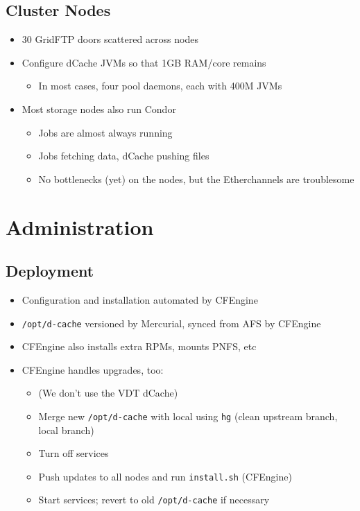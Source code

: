 \documentclass{beamer}
\begin{document}
\subsection{Cluster Nodes}
\begin{frame}
\begin{itemize}
	\item 30 GridFTP doors scattered across nodes
	\item Configure dCache JVMs so that 1GB RAM/core remains
	\begin{itemize}
		\item In most cases, four pool daemons, each with 400M JVMs
	\end{itemize}
	\item Most storage nodes also run Condor
	\begin{itemize}
		\item Jobs are almost always running
		\item Jobs fetching data, dCache pushing files
		\item No bottlenecks (yet) on the nodes, but the Etherchannels are troublesome
	\end{itemize}
\end{itemize}
\end{frame}

\section{Administration}
\subsection{Deployment}
\begin{frame}
\begin{itemize}
	\item Configuration and installation automated by CFEngine
	\item {\tt /opt/d-cache} versioned by Mercurial, synced from AFS by CFEngine
	\item CFEngine also installs extra RPMs, mounts PNFS, etc
	\item CFEngine handles upgrades, too:
	\begin{itemize}
		\item (We don't use the VDT dCache)
		\item Merge new {\tt /opt/d-cache} with local using {\tt hg} (clean upstream branch, local branch)
		\item Turn off services
		\item Push updates to all nodes and run {\tt install.sh} (CFEngine)
		\item Start services; revert to old {\tt /opt/d-cache} if necessary
	\end{itemize}
\end{itemize}
\end{frame}
\end{document}
